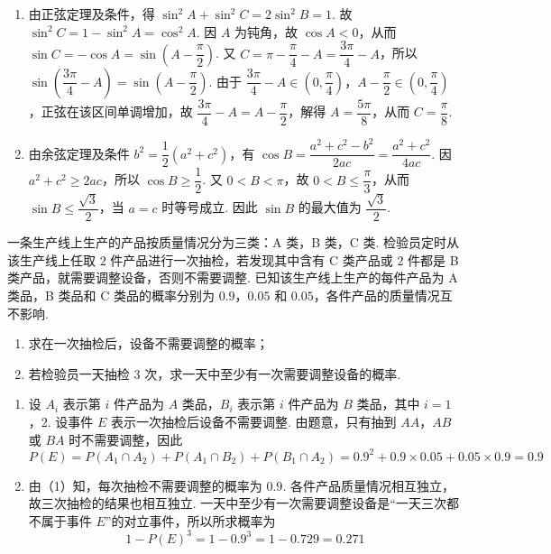 \begin{solution}
\begin{enumerate}
\item 由正弦定理及条件，得 \(\sin^2A+\sin^2C=2\sin^2B=1\). 故 \(\sin^2C=1-\sin^2A=\cos^2A\). 因 \(A\) 为钝角，故 \(\cos A<0\)，从而 \(\sin C=-\cos A=\sin\!\left(A-\dfrac\pi2\right)\). 又 \(C=\pi-\dfrac\pi4-A=\dfrac{3\pi}{4}-A\)，所以 \(\sin\!\left(\dfrac{3\pi}{4}-A\right)=\sin\!\left(A-\dfrac\pi2\right)\). 由于 \(\dfrac{3\pi}{4}-A\in\left(0,\dfrac\pi4\right)\)，\(A-\dfrac\pi2\in\left(0,\dfrac\pi4\right)\)，正弦在该区间单调增加，故 \(\dfrac{3\pi}{4}-A=A-\dfrac\pi2\)，解得 \(A=\dfrac{5\pi}{8}\)，从而 \(C=\dfrac\pi8\).

\item 由余弦定理及条件 \(b^2=\dfrac12(a^2+c^2)\)，有 \(\cos B=\dfrac{a^2+c^2-b^2}{2ac}=\dfrac{a^2+c^2}{4ac}\). 因 \(a^2+c^2\ge2ac\)，所以 \(\cos B\ge\dfrac12\). 又 \(0<B<\pi\)，故 \(0<B\le\dfrac\pi3\)，从而 \(\sin B\le\dfrac{\sqrt3}{2}\)，当 \(a=c\) 时等号成立. 因此 \(\sin B\) 的最大值为 \(\dfrac{\sqrt3}{2}\).
\end{enumerate}
\end{solution}

\begin{problem}
一条生产线上生产的产品按质量情况分为三类：A 类，B 类，C 类. 检验员定时从该生产线上任取 \(2\) 件产品进行一次抽检，若发现其中含有 C 类产品或 \(2\) 件都是 B 类产品，就需要调整设备，否则不需要调整. 已知该生产线上生产的每件产品为 A 类品，B 类品和 C 类品的概率分别为 \(0.9\)，\(0.05\) 和 \(0.05\)，各件产品的质量情况互不影响.

\begin{enumerate}
\item 求在一次抽检后，设备不需要调整的概率；

\item 若检验员一天抽检 \(3\) 次，求一天中至少有一次需要调整设备的概率.
\end{enumerate}
\end{problem}

\begin{solution}
\begin{enumerate}
\item 设 \(A_i\) 表示第 \(i\) 件产品为 \(A\) 类品，\(B_i\) 表示第 \(i\) 件产品为 \(B\) 类品，其中 \(i=1\)，\(2\). 设事件 \(E\) 表示一次抽检后设备不需要调整. 由题意，只有抽到 \(AA\)，\(AB\) 或 \(BA\) 时不需要调整，因此
\[
P(E)=P(A_1\cap A_2)+P(A_1\cap B_2)+P(B_1\cap A_2)
=0.9^2+0.9\times0.05+0.05\times0.9=0.9
\]

\item 由（1）知，每次抽检不需要调整的概率为 \(0.9\). 各件产品质量情况相互独立，故三次抽检的结果也相互独立. 一天中至少有一次需要调整设备是“一天三次都不属于事件 \(E\)”的对立事件，所以所求概率为
\[
1-P(E)^3=1-0.9^3=1-0.729=0.271
\]
\end{enumerate}
\end{solution}

